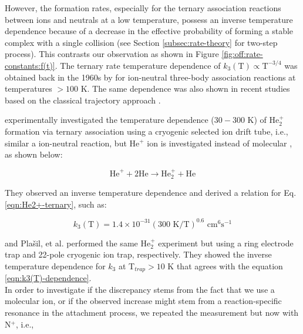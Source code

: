 However, the formation rates, especially for the ternary association reactions
between ions and neutrals at a low temperature, possess an inverse temperature
dependence because of a decrease in the effective probability of forming a
stable complex with a single collision \cite{herbst_dense_1988} (see Section
\ref{subsec:rate-theory} for two-step process). This contrasts our observation
as shown in Figure \ref{fig:off:rate-constants:f(t)}. The ternary rate
temperature dependence of $k_3 (\text{T}) \propto \text{T}^{-3/4}$ was obtained
back in the 1960s by \citet{smirnov_transitions_1967} for ion-neutral
three-body association reactions at temperatures $>100$ K. The same dependence
was also shown in recent studies based on the classical trajectory approach
\cite{perez-rios_communication_2015, greene_universal_2017}.

\citet{bohringer_temperature_1983} experimentally investigated the temperature dependence ($30-300$ K) of He$_2^+$ formation via ternary association using a cryogenic selected ion drift tube, i.e., similar a ion-neutral reaction, but He$^+$ ion is investigated instead of molecular \CD, as shown below:

\begin{equation}
    \text{He}^+ + 2\text{He} \rightarrow \text{He}_2^+ + \text{He}
    \label{eqn:He2+-ternary}
\end{equation}

They observed an inverse temperature dependence and derived a relation for Eq.
\ref{eqn:He2+-ternary}, such as:

\begin{equation}
    k_3 (\text{T}) = 1.4 \times 10^{-31} (300 \text{ K} / \text{T})^{0.6} \text{ cm}^6\text{s}^{-1}
    \label{eqn:k3(T)-dependence}
\end{equation}

\citet{gerlich_experimental_1993} and Pla\v{s}il, et al. \cite{plasil_stabilization_2012} performed the same He$_2^+$ experiment but using a ring electrode trap and 22-pole cryogenic ion trap, respectively. They showed the inverse temperature dependence for $k_3$ at T$_{trap}>10$ K that agrees with the equation \ref{eqn:k3(T)-dependence}.\\

In order to investigate if the discrepancy stems from the fact that we use a
molecular ion, or if the observed increase might stem from a reaction-specific
resonance in the attachment process, we repeated the measurement but now with
N$^+$, i.e.,

